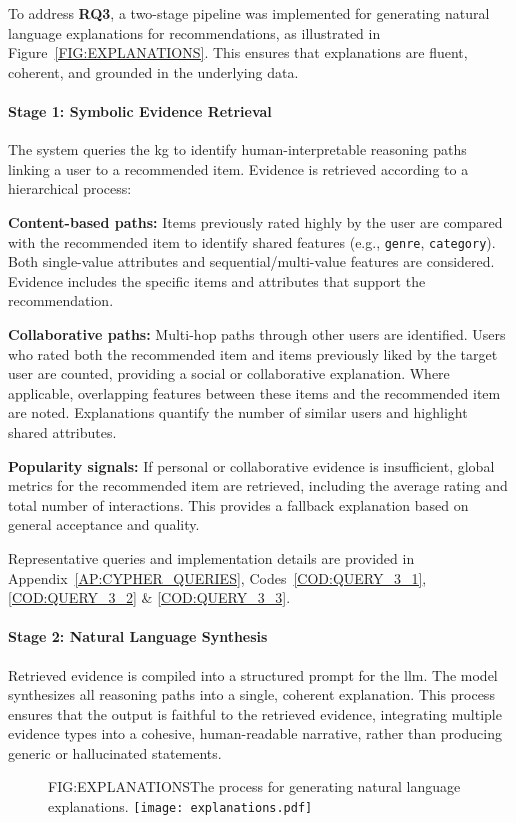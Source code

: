 To address \textbf{RQ3}, a two-stage pipeline was implemented for generating natural language explanations for recommendations, as illustrated in Figure~\ref{FIG:EXPLANATIONS}. This ensures that explanations are fluent, coherent, and grounded in the underlying data.

\paragraph{Stage 1: Symbolic Evidence Retrieval}
The system queries the \ac{kg} to identify human-interpretable reasoning paths linking a user to a recommended item. Evidence is retrieved according to a hierarchical process:
\begin{compactitem}[\textbullet]
    \item \textbf{Content-based paths:} Items previously rated highly by the user are compared with the recommended item to identify shared features (e.g., \texttt{genre}, \texttt{category}). Both single-value attributes and sequential/multi-value features are considered. Evidence includes the specific items and attributes that support the recommendation.
    \item \textbf{Collaborative paths:} Multi-hop paths through other users are identified. Users who rated both the recommended item and items previously liked by the target user are counted, providing a social or collaborative explanation. Where applicable, overlapping features between these items and the recommended item are noted. Explanations quantify the number of similar users and highlight shared attributes.
    \item \textbf{Popularity signals:} If personal or collaborative evidence is insufficient, global metrics for the recommended item are retrieved, including the average rating and total number of interactions. This provides a fallback explanation based on general acceptance and quality.
\end{compactitem}

Representative queries and implementation details are provided in Appendix~\ref{AP:CYPHER_QUERIES}, Codes~\ref{COD:QUERY_3_1}, \ref{COD:QUERY_3_2} \& \ref{COD:QUERY_3_3}.

\paragraph{Stage 2: Natural Language Synthesis} Retrieved evidence is compiled into a structured prompt for the \ac{llm}. The model synthesizes all reasoning paths into a single, coherent explanation. This process ensures that the output is faithful to the retrieved evidence, integrating multiple evidence types into a cohesive, human-readable narrative, rather than producing generic or hallucinated statements.

\begin{figure}[Explanations Generation Process]{FIG:EXPLANATIONS}{The process for generating natural language explanations.}
    \texttt{[image: explanations.pdf]}
\end{figure}